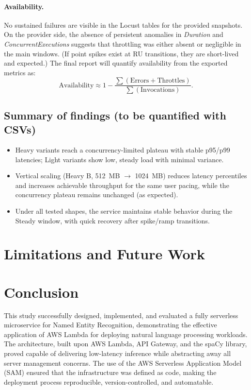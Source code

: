\documentclass[11pt,a4paper]{article}
\begin{document}
\paragraph{Availability.}
No sustained failures are visible in the Locust tables for the provided snapshots. On the provider side, the absence of persistent anomalies in \emph{Duration} and \emph{ConcurrentExecutions} suggests that throttling was either absent or negligible in the main windows. (If point spikes exist at RU transitions, they are short-lived and expected.) The final report will quantify availability from the exported metrics as:
\[
\text{Availability} \approx 1 - \frac{\sum(\text{Errors} + \text{Throttles})}{\sum(\text{Invocations})}.
\]

\subsection{Summary of findings (to be quantified with CSVs)}
\begin{itemize}
  \item Heavy variants reach a concurrency-limited plateau with stable p95/p99 latencies; Light variants show low, steady load with minimal variance.
  \item Vertical scaling (Heavy B, \SI{512}{MB} $\rightarrow$ \SI{1024}{MB}) reduces latency percentiles and increases achievable throughput for the same user pacing, while the concurrency plateau remains unchanged (as expected).
  \item Under all tested shapes, the service maintains stable behavior during the Steady window, with quick recovery after spike/ramp transitions.
\end{itemize}



\section{Limitations and Future Work}


\section{Conclusion}
This study successfully designed, implemented, and evaluated a fully serverless microservice for Named Entity Recognition, demonstrating the effective application of AWS Lambda for deploying natural language processing workloads. The architecture, built upon AWS Lambda, API Gateway, and the spaCy library, proved capable of delivering low-latency inference while abstracting away all server management concerns. The use of the AWS Serverless Application Model (SAM) ensured that the infrastructure was defined as code, making the deployment process reproducible, version-controlled, and automatable.
\end{document}
